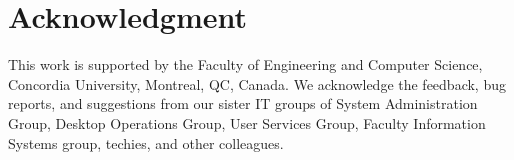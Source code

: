 \section*{Acknowledgment}

This work is supported by the Faculty of Engineering and Computer Science,
Concordia University, Montreal, QC, Canada.
We acknowledge the feedback, bug reports,
and suggestions from our sister IT groups
of System Administration Group, Desktop
Operations Group, User Services Group, Faculty Information Systems group,
techies,
and other
colleagues.



